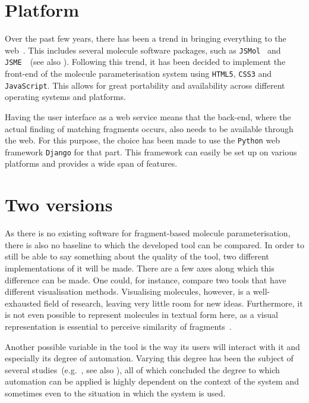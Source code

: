 \section{Platform}
Over the past few years, there has been a trend in bringing everything to the web~\cite{ertl2010molecular}. This includes several molecule software packages, such as \verb|JSMol|~\cite{hanson2013jsmol} and \verb|JSME|~\cite{bienfait2013jsme}~(see also ). Following this trend, it has been decided to implement the front-end of the molecule parameterisation system using \verb|HTML5|, \verb|CSS3| and \verb|JavaScript|. This allows for great portability and availability across different operating systems and platforms.

Having the user interface as a web service means that the back-end, where the actual finding of matching fragments occurs, also needs to be available through the web. For this purpose, the choice has been made to use the \verb|Python| web framework \verb|Django| for that part. This framework can easily be set up on various platforms and provides a wide span of features.


\section{Two versions}
As there is no existing software for fragment-based molecule parameterisation, there is also no baseline to which the developed tool can be compared. In order to still be able to say something about the quality of the tool, two different implementations of it will be made. There are a few axes along which this difference can be made. One could, for instance, compare two tools that have different visualisation methods. Visualising molecules, however, is a well-exhausted field of research, leaving very little room for new ideas. Furthermore, it is not even possible to represent molecules in textual form here, as a visual representation is essential to perceive similarity of fragments~\cite{gallopoulos1994computer}.

Another possible variable in the tool is the way its users will interact with it and especially its degree of automation. Varying this degree has been the subject of several studies~(e.g.~\cite{payne2000varying, horvitz1999principles, marcus1987taking, norman1990problem}, see also ), all of which concluded the degree to which automation can be applied is highly dependent on the context of the system and sometimes even to the situation in which the system is used.


